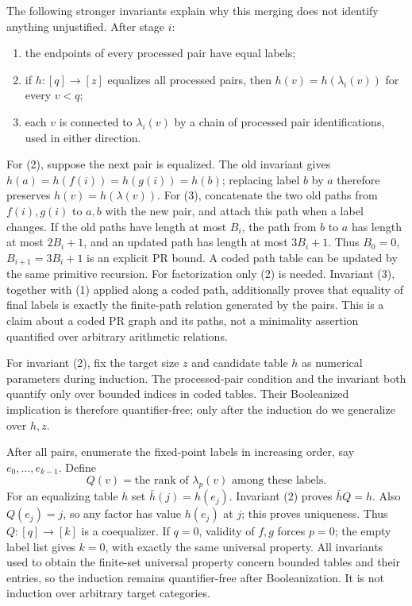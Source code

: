 The following stronger invariants explain why this merging does not
identify anything unjustified. After stage $i$:
\begin{enumerate}
\item the endpoints of every processed pair have equal labels;
\item if $h:[q]\to[z]$ equalizes all processed pairs, then
      $h(v)=h(\lambda_i(v))$ for every $v<q$;
\item each $v$ is connected to $\lambda_i(v)$ by a chain of processed
      pair identifications, used in either direction.
\end{enumerate}
For (2), suppose the next pair is equalized. The old invariant gives
$h(a)=h(f(i))=h(g(i))=h(b)$; replacing label $b$ by $a$ therefore
preserves $h(v)=h(\lambda(v))$. For (3), concatenate the two old paths
from $f(i),g(i)$ to $a,b$ with the new pair, and attach this path when
a label changes. If the old paths have length at most $B_i$, the path from $b$ to $a$
has length at most $2B_i+1$, and an updated path has length at most
$3B_i+1$. Thus $B_0=0$, $B_{i+1}=3B_i+1$ is an explicit PR bound.
A coded path table can be updated by the same primitive recursion.
For factorization only (2) is needed. Invariant (3), together with
(1) applied along a coded path, additionally proves that equality of
final labels is exactly the finite-path relation generated by the
pairs. This is a claim about a coded PR graph and its paths, not a
minimality assertion quantified over arbitrary arithmetic relations.

For invariant (2), fix the target size $z$ and candidate table $h$ as
numerical parameters during induction. The processed-pair condition and
the invariant both quantify only over bounded indices in coded tables.
Their Booleanized implication is therefore quantifier-free; only after
the induction do we generalize over $h,z$.

After all pairs, enumerate the fixed-point labels in increasing order,
say $e_0,\ldots,e_{k-1}$. Define
\[
 Q(v)=\text{the rank of }\lambda_p(v)\text{ among these labels}.
\]
For an equalizing table $h$ set $\bar h(j)=h(e_j)$. Invariant (2)
proves $\bar h Q=h$. Also $Q(e_j)=j$, so any factor has value $h(e_j)$
at $j$; this proves uniqueness. Thus $Q:[q]\to[k]$ is a coequalizer.
If $q=0$, validity of $f,g$ forces $p=0$; the empty label list gives
$k=0$, with exactly the same universal property. All invariants used
to obtain the finite-set universal property concern bounded tables
and their entries, so the induction remains quantifier-free after
Booleanization. It is not induction over arbitrary target categories.

